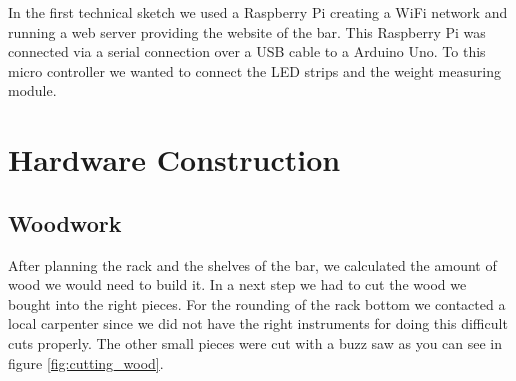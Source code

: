 \documentclass{acm_proc_article-sp}
\begin{document}
In the first technical sketch we used a Raspberry Pi creating a WiFi network and running a web server providing the website of the bar. This Raspberry Pi was connected via a serial connection over a USB cable to a Arduino Uno. To this micro controller we wanted to connect the LED strips and the weight measuring module.

\section{Hardware Construction}
\subsection{Woodwork}

\begin{minipage}{\linewidth}%
\label{fig:cutting_wood}%
\end{minipage}


After planning the rack and the shelves of the bar, we calculated the amount of wood we would need to build it. In a next step we had to cut the wood we bought into the right pieces. For the rounding of the rack bottom we contacted a local carpenter since we did not have the right instruments for doing this difficult cuts properly. The other small pieces were cut with a buzz saw as you can see in figure \ref{fig:cutting_wood}.

\begin{minipage}{\linewidth}%
\label{fig:assembling}%
\end{minipage}
\end{document}
